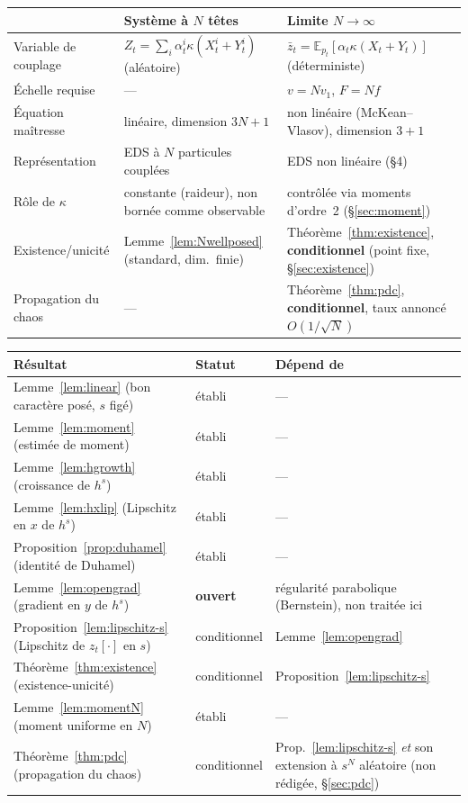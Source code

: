 \documentclass[11pt,a4paper]{article}
\newcommand{\E}{\mathbb{E}}
\theoremstyle{plain}
\theoremstyle{definition}
\begin{document}
\begin{center}
\small
\begin{tabular}{@{}p{3.1cm}p{5.7cm}p{6.2cm}@{}}
\toprule
 & Syst\`eme \`a $N$ t\^etes & Limite $N\to\infty$ \\
\midrule
Variable de couplage & $Z_t=\sum_i\alpha_t^i\kappa(X_t^i+Y_t^i)$ (al\'eatoire) & $\bar z_t = \E_{p_t}[\alpha_t\kappa(X_t+Y_t)]$ (d\'eterministe) \\
\'Echelle requise & --- & $v=Nv_1$, $F=Nf$ \\
\'Equation ma\^itresse & lin\'eaire, dimension $3N+1$ & non lin\'eaire (McKean--Vlasov), dimension $3+1$ \\
Repr\'esentation & EDS \`a $N$ particules coupl\'ees & EDS non lin\'eaire (\S4) \\
R\^ole de $\kappa$ & constante (raideur), non born\'ee comme observable & contr\^ol\'ee via moments d'ordre~2 (\S\ref{sec:moment}) \\
Existence/unicit\'e & Lemme~\ref{lem:Nwellposed} (standard, dim.\ finie) & Th\'eor\`eme~\ref{thm:existence}, \textbf{conditionnel} (point fixe, \S\ref{sec:existence}) \\
Propagation du chaos & --- & Th\'eor\`eme~\ref{thm:pdc}, \textbf{conditionnel}, taux annonc\'e $O(1/\sqrt N)$ \\
\bottomrule
\end{tabular}
\end{center}

\begin{center}
\small
\begin{tabular}{@{}p{6.3cm}p{2.3cm}p{6.4cm}@{}}
\toprule
R\'esultat & Statut & D\'epend de \\
\midrule
Lemme~\ref{lem:linear} (bon caract\`ere pos\'e, $s$ fig\'e) & \'etabli & --- \\
Lemme~\ref{lem:moment} (estim\'ee de moment) & \'etabli & --- \\
Lemme~\ref{lem:hgrowth} (croissance de $h^s$) & \'etabli & --- \\
Lemme~\ref{lem:hxlip} (Lipschitz en $x$ de $h^s$) & \'etabli & --- \\
Proposition~\ref{prop:duhamel} (identit\'e de Duhamel) & \'etabli & --- \\
Lemme~\ref{lem:opengrad} (gradient en $y$ de $h^s$) & \textbf{ouvert} & r\'egularit\'e parabolique (Bernstein), non trait\'ee ici \\
Proposition~\ref{lem:lipschitz-s} (Lipschitz de $z_t[\cdot]$ en $s$) & conditionnel & Lemme~\ref{lem:opengrad} \\
Th\'eor\`eme~\ref{thm:existence} (existence-unicit\'e) & conditionnel & Proposition~\ref{lem:lipschitz-s} \\
Lemme~\ref{lem:momentN} (moment uniforme en $N$) & \'etabli & --- \\
Th\'eor\`eme~\ref{thm:pdc} (propagation du chaos) & conditionnel & Prop.~\ref{lem:lipschitz-s} \emph{et} son extension \`a $s^N$ al\'eatoire (non r\'edig\'ee, \S\ref{sec:pdc}) \\
\bottomrule
\end{tabular}
\end{center}
\end{document}
